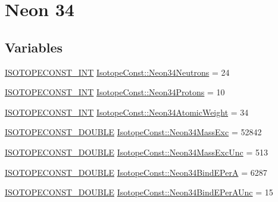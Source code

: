 \hypertarget{group___isotope_const-_neon-_ne34}{}\section{Neon 34}
\label{group___isotope_const-_neon-_ne34}
\subsection*{Variables}
\begin{DoxyCompactItemize}
\item 
\mbox{\hyperlink{group___isotope_const-_macros_ga5f18360b3e99483a35c32d789e62621c}{I\+S\+O\+T\+O\+P\+E\+C\+O\+N\+S\+T\+\_\+\+I\+NT}} \mbox{\hyperlink{group___isotope_const-_neon-_ne34_ga91128d24e75e698eed62cb3c3fc783f8}{Isotope\+Const\+::\+Neon34\+Neutrons}} = 24
\item 
\mbox{\hyperlink{group___isotope_const-_macros_ga5f18360b3e99483a35c32d789e62621c}{I\+S\+O\+T\+O\+P\+E\+C\+O\+N\+S\+T\+\_\+\+I\+NT}} \mbox{\hyperlink{group___isotope_const-_neon-_ne34_ga5a846256fcef65fb27fbd6119325a8ae}{Isotope\+Const\+::\+Neon34\+Protons}} = 10
\item 
\mbox{\hyperlink{group___isotope_const-_macros_ga5f18360b3e99483a35c32d789e62621c}{I\+S\+O\+T\+O\+P\+E\+C\+O\+N\+S\+T\+\_\+\+I\+NT}} \mbox{\hyperlink{group___isotope_const-_neon-_ne34_ga08241f833d201826d2c390aba08658cc}{Isotope\+Const\+::\+Neon34\+Atomic\+Weight}} = 34
\item 
\mbox{\hyperlink{group___isotope_const-_macros_ga8f45a7272ce02c0b4c65c44636ed719a}{I\+S\+O\+T\+O\+P\+E\+C\+O\+N\+S\+T\+\_\+\+D\+O\+U\+B\+LE}} \mbox{\hyperlink{group___isotope_const-_neon-_ne34_gaa95623f0bbd75a6c8d325250054ab232}{Isotope\+Const\+::\+Neon34\+Mass\+Exc}} = 52842
\item 
\mbox{\hyperlink{group___isotope_const-_macros_ga8f45a7272ce02c0b4c65c44636ed719a}{I\+S\+O\+T\+O\+P\+E\+C\+O\+N\+S\+T\+\_\+\+D\+O\+U\+B\+LE}} \mbox{\hyperlink{group___isotope_const-_neon-_ne34_gae28f89d33086aa822c4f88d3cf9f2e12}{Isotope\+Const\+::\+Neon34\+Mass\+Exc\+Unc}} = 513
\item 
\mbox{\hyperlink{group___isotope_const-_macros_ga8f45a7272ce02c0b4c65c44636ed719a}{I\+S\+O\+T\+O\+P\+E\+C\+O\+N\+S\+T\+\_\+\+D\+O\+U\+B\+LE}} \mbox{\hyperlink{group___isotope_const-_neon-_ne34_ga53d6d3199a58e57eff0a00dd63ced94e}{Isotope\+Const\+::\+Neon34\+Bind\+E\+PerA}} = 6287
\item 
\mbox{\hyperlink{group___isotope_const-_macros_ga8f45a7272ce02c0b4c65c44636ed719a}{I\+S\+O\+T\+O\+P\+E\+C\+O\+N\+S\+T\+\_\+\+D\+O\+U\+B\+LE}} \mbox{\hyperlink{group___isotope_const-_neon-_ne34_ga7c6e5c5a650c4fa6efff3b44f58d46aa}{Isotope\+Const\+::\+Neon34\+Bind\+E\+Per\+A\+Unc}} = 15

\end{DoxyCompactItemize}
